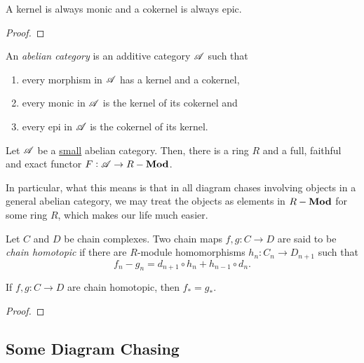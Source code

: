 \begin{proposition}
    A kernel is always monic and a cokernel is always epic.
\end{proposition}
\begin{proof}
    
\end{proof}

\begin{definition}
    An \emph{abelian category} is an additive category $\mathscr A$ such that 
    \begin{enumerate}
        \item every morphism in $\mathscr A$ has a kernel and a cokernel,
        \item every monic in $\mathscr A$ is the kernel of its cokernel and
        \item every epi in $\mathscr A$ is the cokernel of its kernel.
    \end{enumerate}
\end{definition}

\begin{theorem}
    Let $\mathscr A$ be a \underline{small} abelian category. Then, there is a ring $R$ and a full, faithful and exact functor $F:\mathscr A\to R-\mathbf{Mod}$.
\end{theorem}

In particular, what this means is that in all diagram chases involving objects in a general abelian category, we may treat the objects as elements in $R-\mathbf{Mod}$ for some ring $R$, which makes our life much easier.

\begin{definition}
    Let $C$ and $D$ be chain complexes. Two chain maps $f,g: C\to D$ are said to be \emph{chain homotopic} if there are $R$-module homomorphisms $h_n: C_n\to D_{n + 1}$ such that 
    \begin{equation*}
        f_n - g_n = d_{n + 1}\circ h_n + h_{n - 1}\circ d_n.
    \end{equation*}
\end{definition}

\begin{proposition}
    If $f,g: C\to D$ are chain homotopic, then $f_\ast = g_\ast$.
\end{proposition}
\begin{proof}
    
\end{proof}

\subsection{Some Diagram Chasing}

